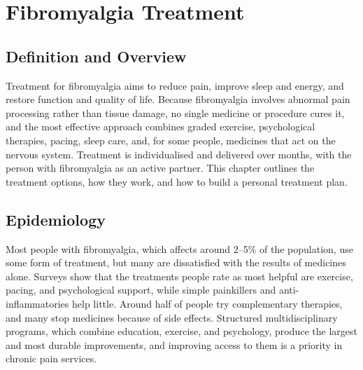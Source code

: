 \chapter{Fibromyalgia Treatment}

\section*{Definition and Overview}
Treatment for fibromyalgia aims to reduce pain, improve sleep and energy, and restore function and quality of life. Because fibromyalgia involves abnormal pain processing rather than tissue damage, no single medicine or procedure cures it, and the most effective approach combines graded exercise, psychological therapies, pacing, sleep care, and, for some people, medicines that act on the nervous system. Treatment is individualised and delivered over months, with the person with fibromyalgia as an active partner. This chapter outlines the treatment options, how they work, and how to build a personal treatment plan.

\section*{Epidemiology}
Most people with fibromyalgia, which affects around 2--5\% of the population, use some form of treatment, but many are dissatisfied with the results of medicines alone. Surveys show that the treatments people rate as most helpful are exercise, pacing, and psychological support, while simple painkillers and anti-inflammatories help little. Around half of people try complementary therapies, and many stop medicines because of side effects. Structured multidisciplinary programs, which combine education, exercise, and psychology, produce the largest and most durable improvements, and improving access to them is a priority in chronic pain services.

